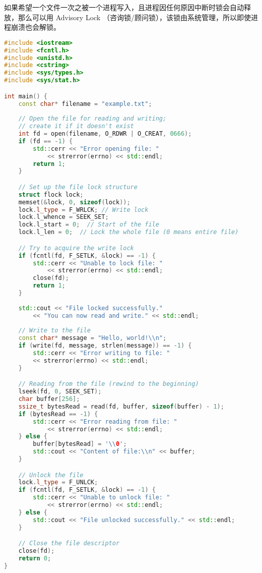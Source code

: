 
如果希望一个文件一次之被一个进程写入，且进程因任何原因中断时锁会自动释放，那么可以用 Advisory Lock （咨询锁/顾问锁），该锁由系统管理，所以即使进程崩溃也会解锁。

\begin{lstlisting}[language=cpp]
#include <iostream>
#include <fcntl.h>
#include <unistd.h>
#include <cstring>
#include <sys/types.h>
#include <sys/stat.h>

int main() {
    const char* filename = "example.txt";
    
    // Open the file for reading and writing;
    // create it if it doesn't exist
    int fd = open(filename, O_RDWR | O_CREAT, 0666);
    if (fd == -1) {
        std::cerr << "Error opening file: "
            << strerror(errno) << std::endl;
        return 1;
    }

    // Set up the file lock structure
    struct flock lock;
    memset(&lock, 0, sizeof(lock));
    lock.l_type = F_WRLCK; // Write lock
    lock.l_whence = SEEK_SET;
    lock.l_start = 0;  // Start of the file
    lock.l_len = 0;  // Lock the whole file (0 means entire file)

    // Try to acquire the write lock
    if (fcntl(fd, F_SETLK, &lock) == -1) {
        std::cerr << "Unable to lock file: "
            << strerror(errno) << std::endl;
        close(fd);
        return 1;
    }
    
    std::cout << "File locked successfully."
        << "You can now read and write." << std::endl;
    
    // Write to the file
    const char* message = "Hello, world!\\n";
    if (write(fd, message, strlen(message)) == -1) {
        std::cerr << "Error writing to file: "
        << strerror(errno) << std::endl;
    }

    // Reading from the file (rewind to the beginning)
    lseek(fd, 0, SEEK_SET);
    char buffer[256];
    ssize_t bytesRead = read(fd, buffer, sizeof(buffer) - 1);
    if (bytesRead == -1) {
        std::cerr << "Error reading from file: "
            << strerror(errno) << std::endl;
    } else {
        buffer[bytesRead] = '\\0';
        std::cout << "Content of file:\\n" << buffer;
    }

    // Unlock the file
    lock.l_type = F_UNLCK;
    if (fcntl(fd, F_SETLK, &lock) == -1) {
        std::cerr << "Unable to unlock file: "
            << strerror(errno) << std::endl;
    } else {
        std::cout << "File unlocked successfully." << std::endl;
    }

    // Close the file descriptor
    close(fd);
    return 0;
}
\end{lstlisting}
